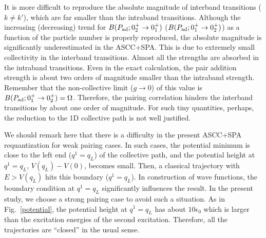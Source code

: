 \documentclass[%
superscriptaddress,
showpacs,
nofootinbib,
amsmath,amssymb,
aps,
prc,
twocolumn,
floatfix ]%
{revtex4-1}
\begin{document}
It is more difficult to reproduce the absolute magnitude of
interband transitions ($k\neq k'$), 
which are far smaller than the intraband transitions.
Although the increasing (decreasing) trend for
$B(P_{\rm ad};0_2^+\rightarrow 0_1^+)$
($B(P_{\rm ad};0_1^+\rightarrow 0_2^+)$)
as a function of the particle number is properly reproduced,
the absolute magnitude is significantly underestimated in the ASCC+SPA.
This is due to extremely small collectivity in the interband transitions.
Almost all the strengths are absorbed in the intraband transitions.
Even in the exact calculation, the pair addition strength is
about two orders of magnitude smaller than the intraband strength.
Remember that the non-collective limit ($g\rightarrow 0$) of this
value is $B(P_{\rm ad};0_1^+\rightarrow 0_2^+)=\Omega$.
Therefore, the pairing correlation hinders the interband transitions
by about one order of magnitude.
For such tiny quantities, perhaps, 
the reduction to the 1D collective path is not well justified.



We should remark here that there is a difficulty in the present ASCC+SPA
requantization for weak pairing cases.
In such cases, the potential minimum is close to the left end 
($q^1=q_L$) of the collective path, and the potential height
at $q^1=q_L$, $V(q_L) - V(0)$, becomes small.
Then, a classical trajectory with $E>V(q_L)$ hits this boundary ($q^1=q_L$).
In construction of wave functions,
the boundary condition at $q^1=q_L$ significantly influences the result.
In the present study, we choose a strong pairing case to avoid
such a situation.
As in Fig.~\ref{potential}, the potential height at $q^1=q_L$ has
about $10\epsilon_0$ which is larger than the excitation energies
of the second excitation.
Therefore, all the trajectories are ``closed'' in the usual sense.
\end{document}
